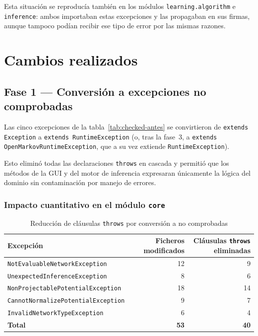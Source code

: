 \documentclass[12pt,a4paper]{article}
\begin{document}
Esta situación se reproducía también en los módulos \texttt{learning.algorithm}
e \texttt{inference}: ambos importaban estas excepciones y las propagaban en
sus firmas, aunque tampoco podían recibir ese tipo de error por las mismas
razones.

\section{Cambios realizados}
\label{sec:cambios}

\subsection{Fase 1 — Conversión a excepciones no comprobadas}

Las cinco excepciones de la tabla~\ref{tab:checked-antes} se convirtieron de
\texttt{extends Exception} a \texttt{extends RuntimeException} (o, tras la
fase~3, a \texttt{extends OpenMarkovRuntimeException}, que a su vez extiende
\texttt{RuntimeException}).

Esto eliminó todas las declaraciones \texttt{throws} en cascada y permitió que
los métodos de la GUI y del motor de inferencia expresaran únicamente la lógica
del dominio sin contaminación por manejo de errores.

\subsubsection*{Impacto cuantitativo en el módulo \texttt{core}}

\begin{table}[H]
\centering
\begin{tabularx}{\textwidth}{Xrr}
\toprule
Excepción & Ficheros modificados & Cláusulas \texttt{throws} eliminadas \\
\midrule
\texttt{NotEvaluableNetworkException}   & 12 &  9 \\
\texttt{UnexpectedInferenceException}   &  8 &  6 \\
\texttt{NonProjectablePotentialException} & 18 & 14 \\
\texttt{CannotNormalizePotentialException} &  9 &  7 \\
\texttt{InvalidNetworkTypeException}    &  6 &  4 \\
\midrule
\textbf{Total}                          & \textbf{53} & \textbf{40} \\
\bottomrule
\end{tabularx}
\caption{Reducción de cláusulas \texttt{throws} por conversión a no comprobadas}
\label{tab:throws-eliminadas}
\end{table}
\end{document}

